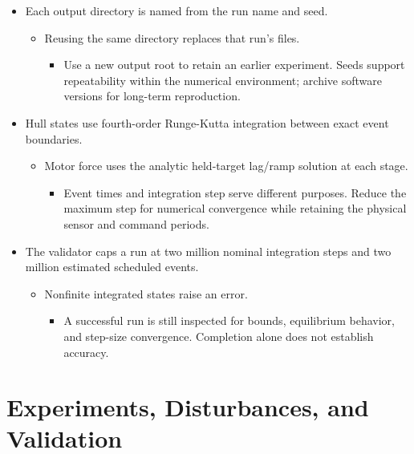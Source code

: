 \documentclass[10pt,letterpaper]{article}
\begin{document}
\begin{itemize}
\item
  Each output directory is named from the run name and seed.

  \begin{itemize}
  \item
    Reusing the same directory replaces that run's files.

    \begin{itemize}
    \item
      Use a new output root to retain an earlier experiment. Seeds support repeatability within the numerical environment; archive software versions for long-term reproduction.
    \end{itemize}
  \end{itemize}
\item
  Hull states use fourth-order Runge-Kutta integration between exact event boundaries.

  \begin{itemize}
  \item
    Motor force uses the analytic held-target lag/ramp solution at each stage.

    \begin{itemize}
    \item
      Event times and integration step serve different purposes. Reduce the maximum step for numerical convergence while retaining the physical sensor and command periods.
    \end{itemize}
  \end{itemize}
\item
  The validator caps a run at two million nominal integration steps and two million estimated scheduled events.

  \begin{itemize}
  \item
    Nonfinite integrated states raise an error.

    \begin{itemize}
    \item
      A successful run is still inspected for bounds, equilibrium behavior, and step-size convergence. Completion alone does not establish accuracy.
    \end{itemize}
  \end{itemize}
\end{itemize}

\section{Experiments, Disturbances, and Validation}
\end{document}
